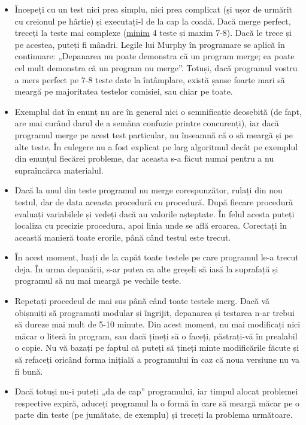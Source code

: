 \begin{itemize}

\item Începeți cu un test nici prea simplu, nici prea complicat (și ușor de
  urmărit cu creionul pe hârtie) și executați-l de la cap la coadă. Dacă merge
  perfect, treceți la teste mai complexe (\underline{minim} 4 teste și maxim
  7-8). Dacă le trece și pe acestea, puteți fi mândri. Legile lui Murphy în
  programare se aplică în continuare: „Depanarea nu poate demonstra că un
  program merge; ea poate cel mult demonstra că un program nu merge”. Totuși,
  dacă programul vostru a mers perfect pe 7-8 teste date la întâmplare, există
  șanse foarte mari să meargă pe majoritatea testelor comisiei, sau chiar pe
  toate.
  
\item Exemplul dat în enunț nu are în general nici o semnificație deosebită
  (de fapt, are mai curând darul de a semăna confuzie printre concurenți), iar
  dacă programul merge pe acest test particular, nu înseamnă că o să meargă și
  pe alte teste. În culegere nu a fost explicat pe larg algoritmul decât pe
  exemplul din enunțul fiecărei probleme, dar aceasta s-a făcut numai pentru a
  nu supraîncărca materialul.
  
\item Dacă la unul din teste programul nu merge corespunzător, rulați din nou
  testul, dar de data aceasta procedură cu procedură. După fiecare procedură
  evaluați variabilele și vedeți dacă au valorile așteptate. În felul acesta
  puteți localiza cu precizie procedura, apoi linia unde se află
  eroarea. Corectați în această manieră toate erorile, până când testul este
  trecut.
  
\item În acest moment, luați de la capăt toate testele pe care programul le-a
  trecut deja. În urma depanării, s-ar putea ca alte greșeli să iasă la
  suprafață și programul să nu mai meargă pe vechile teste.
  
\item Repetați procedeul de mai sus până când toate testele merg. Dacă vă
  obișnuiți să programați modular și îngrijit, depanarea și testarea n-ar
  trebui să dureze mai mult de 5-10 minute. Din acest moment, nu mai
  modificați nici măcar o literă în program, sau dacă țineți să o faceți,
  păstrați-vă în prealabil o copie. Nu vă bazați pe faptul că puteți să țineți
  minte modificările făcute și să refaceți oricând forma inițială a
  programului în caz că noua versiune nu va fi bună.
  
\item Dacă totuși nu-i puteți „da de cap” programului, iar timpul alocat
  problemei respective expiră, aduceți programul la o formă în care să meargă
  măcar pe o parte din teste (pe jumătate, de exemplu) și treceți la problema
  următoare.

\end{itemize}

